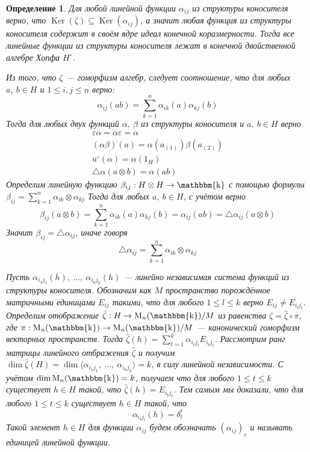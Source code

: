 \documentclass[12pt, reqno, a4paper, oneside, notitlepage]{amsart}
\theoremstyle{mytheoremstyle}
\theoremstyle{myremarkstyle}
\newtheorem{definition}[theorem]{Определение}
\numberwithin{equation}{section}
\DeclareMathOperator{\Ker}{Ker}
\DeclareMathOperator{\fld}{\mathbbm{k}}
\begin{document}
\begin{definition}
Для любой линейной функции $\alpha_{ij}$ из структуры коносителя верно, что $\Ker(\zeta) \subseteq \Ker(\alpha_{ij})$, а значит любая функция из структуры коносителя
содержит в своём ядре идеал конечной коразмерности. Тогда все линейные функции из структуры коносителя лежат в конечной двойственной алгебре Хопфа $H^\circ$.

Из того, что $\zeta$ --- гоморфизм алгебр, следует соотношение, что для любых $a,\ b \in H$ и $1 \leq i,j \leq n$ верно:
\begin{equation} \label{product}
  \alpha_{ij}(ab) = \sum\limits_{k=1}^{n}\alpha_{ik}(a)\alpha_{kj}(b) 
\end{equation}
Тогда для любых двух функций  $\alpha,\ \beta$ из структуры коносителя и $a,\ b \in H$ верно
\begin{eqnarray}
    \varepsilon\alpha = \alpha\varepsilon = \alpha \label{str1}\\
    (\alpha\beta)(a) = \alpha(a_{(1)})\beta(a_{(2)}) \label{str2}\\
    u^\circ(\alpha) = \alpha(1_H) \label{str3}\\
    \bigtriangleup\alpha(a \otimes b) = \alpha(ab) \label{str4}
\end{eqnarray}
Определим линейную функцию $\beta_{ij}: H \otimes H \to \fld$ с помощью формулы $\beta_{ij} = \sum\limits_{k=1}^{n}\alpha_{ik} \otimes \alpha_{kj}$
Тогда для любых $a,\ b \in H$, с учётом верно 
\[
  \beta_{ij}(a \otimes b) = \sum\limits_{k=1}^{n}\alpha_{ik}(a)\alpha_{kj}(b) = \alpha_{ij}(ab) = \triangle\alpha_{ij}(a \otimes b)
\]
Значит $\beta_{ij} = \triangle\alpha_{ij}$, иначе говоря
\begin{equation}\label{coproduct}
  \triangle\alpha_{ij} = \sum\limits_{k=1}^{n}\alpha_{ik} \otimes \alpha_{kj}
\end{equation}

Пусть $\alpha_{i_1j_1}(h),\ \dots,\ \alpha_{i_kj_k}(h)$ --- линейно независимая система функций из структуры коносителя.
Обозначим как $M$ пространство порождённое матричными единицами $E_{ij}$ такими, что для любого $1 \leq l \leq k$ верно $E_{ij} \neq E_{i_lj_l}$.
Определим отображение $\hat \zeta: H \to \mathrm{M}_n(\fld)/M$ из равенства $\zeta = \hat \zeta \circ \pi$, 
где $\pi: \mathrm{M}_n(\fld) \to \mathrm{M}_n(\fld)/M$ --- канонический гоморфизм векторных пространств.
Тогда $\hat \zeta(h) = \sum\limits_{t =1}^k\alpha_{i_tj_t}E_{i_tj_t}$. Рассмотрим ранг матрицы линейного отбражения $\hat \zeta$ и получим
$\dim \hat \zeta(H) = \dim \langle \alpha_{i_1j_1},\ \dots,\ \alpha_{i_kj_k} \rangle = k$, в силу линейной независимости.
С учётом $\dim \mathrm{M}_n(\fld) = k$, получаем что для любого $1 \leq t \leq k$ существует $h \in H$ такой, что $\hat \zeta(h) = E_{i_tj_t}$.
Тем самым мы доказали, что для любого $1 \leq t \leq k$ существует $h \in H$ такой, что
\[
  \alpha_{i_lj_l}(h) = \delta^t_l
\]
Такой элемент $h \in H$ для функции $\alpha_{ij}$ будем обозначать $\left(\alpha_{ij}\right)_\varepsilon$ и называть \textit{единицей линейной функции}.


\end{definition}
\end{document}
